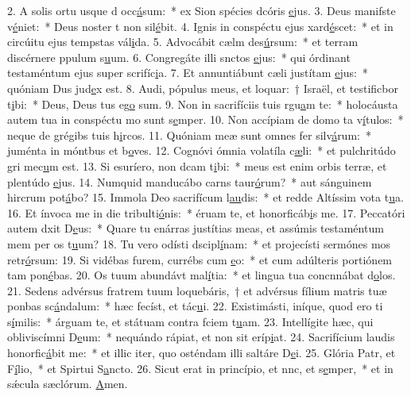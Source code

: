 2. A solis ortu usque d occ\uline{á}sum:~* ex Sion spécies dcóris \uline{e}jus.
3. Deus manifste v\uline{é}niet:~* Deus noster t non sil\uline{é}bit.
4. Ignis in conspéctu ejus xard\uline{é}scet:~* et in circúitu ejus tempstas vál\uline{i}da.
5. Advocábit cælm des\uline{ú}rsum:~* et terram discérnere ppulum s\uline{u}um.
6. Congregáte illi snctos \uline{e}jus:~* qui órdinant testaméntum ejus super scrifíc\uline{i}a.
7. Et annuntiábunt cæli justítam \uline{e}jus:~* quóniam Dus jud\uline{e}x est.
8. Audi, pópulus meus, et loquar:~† Israël, et testificbor t\uline{i}bi:~* Deus, Deus tus eg\uline{o} sum.
9. Non in sacrifíciis tuis rgu\uline{a}m te:~* holocáusta autem tua in conspéctu mo sunt s\uline{e}mper.
10. Non accípiam de domo ta v\uline{í}tulos:~* neque de grégibs tuis h\uline{i}rcos.
11. Quóniam meæ sunt omnes fer silv\uline{á}rum:~* juménta in móntbus et b\uline{o}ves.
12. Cognóvi ómnia volatíla c\uline{æ}li:~* et pulchritúdo gri mec\uline{u}m est.
13. Si esuríero, non dcam t\uline{i}bi:~* meus est enim orbis terræ, et plentúdo \uline{e}jus.
14. Numquid manducábo carns taur\uline{ó}rum?~* aut sánguinem hircrum pot\uline{á}bo?
15. Immola Deo sacrifícum l\uline{au}dis:~* et redde Altíssim vota t\uline{u}a.
16. Et ínvoca me in die tribulti\uline{ó}nis:~* éruam te, et honorficáb\uline{i}s me.
17. Peccatóri autem dxit D\uline{e}us:~* Quare tu enárras justítias meas, et assúmis testaméntum mem per os t\uline{u}um?
18. Tu vero odísti dscipl\uline{í}nam:~* et projecísti sermónes mos retr\uline{ó}rsum:
19. Si vidébas furem, currébs cum \uline{e}o:~* et cum adúlteris portiónem tam pon\uline{é}bas.
20. Os tuum abundávt mal\uline{í}tia:~* et lingua tua concnnábat d\uline{o}los.
21. Sedens advérsus fratrem tuum loquebáris,~† et advérsus fílium matris tuæ ponbas sc\uline{á}ndalum:~* hæc fecíst, et tác\uline{u}i.
22. Existimásti, iníque, quod ero ti s\uline{í}milis:~* árguam te, et státuam contra fciem t\uline{u}am.
23. Intellígite hæc, qui obliviscímni D\uline{e}um:~* nequándo rápiat, et non sit  eríp\uline{i}at.
24. Sacrifícium laudis honorfic\uline{á}bit me:~* et illic iter, quo osténdam illi saltáre D\uline{e}i.
25. Glória Patr, et F\uline{í}lio,~* et Spirtui S\uline{a}ncto.
26. Sicut erat in princípio, et nnc, et s\uline{e}mper,~* et in sǽcula sæclórum. \uline{A}men.
